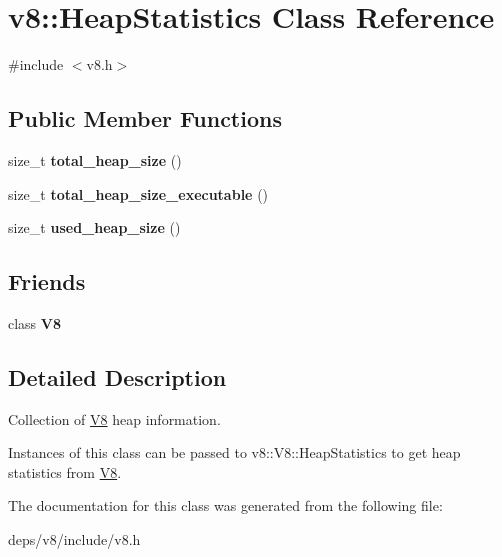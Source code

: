 \hypertarget{classv8_1_1_heap_statistics}{}\section{v8\+:\+:Heap\+Statistics Class Reference}
\label{classv8_1_1_heap_statistics}


{\ttfamily \#include $<$v8.\+h$>$}

\subsection*{Public Member Functions}
\begin{DoxyCompactItemize}
\item 
\hypertarget{classv8_1_1_heap_statistics_ac005b9c55d5818b6969c8fd61359139b}{}size\+\_\+t {\bfseries total\+\_\+heap\+\_\+size} ()\label{classv8_1_1_heap_statistics_ac005b9c55d5818b6969c8fd61359139b}

\item 
\hypertarget{classv8_1_1_heap_statistics_aa935ea51c12ec64049c06b532dbb4f8d}{}size\+\_\+t {\bfseries total\+\_\+heap\+\_\+size\+\_\+executable} ()\label{classv8_1_1_heap_statistics_aa935ea51c12ec64049c06b532dbb4f8d}

\item 
\hypertarget{classv8_1_1_heap_statistics_a05ecb48bceea49d2fe430c81df02babc}{}size\+\_\+t {\bfseries used\+\_\+heap\+\_\+size} ()\label{classv8_1_1_heap_statistics_a05ecb48bceea49d2fe430c81df02babc}

\end{DoxyCompactItemize}
\subsection*{Friends}
\begin{DoxyCompactItemize}
\item 
\hypertarget{classv8_1_1_heap_statistics_a51a1fbf409294cf02a99a020ac94a763}{}class {\bfseries V8}\label{classv8_1_1_heap_statistics_a51a1fbf409294cf02a99a020ac94a763}

\end{DoxyCompactItemize}


\subsection{Detailed Description}
Collection of \hyperlink{classv8_1_1_v8}{V8} heap information.

Instances of this class can be passed to v8\+::\+V8\+::\+Heap\+Statistics to get heap statistics from \hyperlink{classv8_1_1_v8}{V8}. 

The documentation for this class was generated from the following file\+:\begin{DoxyCompactItemize}
\item 
deps/v8/include/v8.\+h\end{DoxyCompactItemize}
